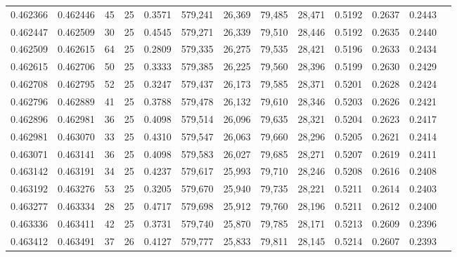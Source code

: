 \begin{tabular}{rrrrrrrrrrrrr}
0.462366 & 0.462446 &    45 &  25 &                                     0.3571 & 579,241 &  26,369 &  79,485 &  28,471 & 0.5192 & 0.2637 & 0.2443 \\
0.462447 & 0.462509 &    30 &  25 &                                     0.4545 & 579,271 &  26,339 &  79,510 &  28,446 & 0.5192 & 0.2635 & 0.2440 \\
0.462509 & 0.462615 &    64 &  25 &                                     0.2809 & 579,335 &  26,275 &  79,535 &  28,421 & 0.5196 & 0.2633 & 0.2434 \\
0.462615 & 0.462706 &    50 &  25 &                                     0.3333 & 579,385 &  26,225 &  79,560 &  28,396 & 0.5199 & 0.2630 & 0.2429 \\
0.462708 & 0.462795 &    52 &  25 &                                     0.3247 & 579,437 &  26,173 &  79,585 &  28,371 & 0.5201 & 0.2628 & 0.2424 \\
0.462796 & 0.462889 &    41 &  25 &                                     0.3788 & 579,478 &  26,132 &  79,610 &  28,346 & 0.5203 & 0.2626 & 0.2421 \\
0.462896 & 0.462981 &    36 &  25 &                                     0.4098 & 579,514 &  26,096 &  79,635 &  28,321 & 0.5204 & 0.2623 & 0.2417 \\
0.462981 & 0.463070 &    33 &  25 &                                     0.4310 & 579,547 &  26,063 &  79,660 &  28,296 & 0.5205 & 0.2621 & 0.2414 \\
0.463071 & 0.463141 &    36 &  25 &                                     0.4098 & 579,583 &  26,027 &  79,685 &  28,271 & 0.5207 & 0.2619 & 0.2411 \\
0.463142 & 0.463191 &    34 &  25 &                                     0.4237 & 579,617 &  25,993 &  79,710 &  28,246 & 0.5208 & 0.2616 & 0.2408 \\
0.463192 & 0.463276 &    53 &  25 &                                     0.3205 & 579,670 &  25,940 &  79,735 &  28,221 & 0.5211 & 0.2614 & 0.2403 \\
0.463277 & 0.463334 &    28 &  25 &                                     0.4717 & 579,698 &  25,912 &  79,760 &  28,196 & 0.5211 & 0.2612 & 0.2400 \\
0.463336 & 0.463411 &    42 &  25 &                                     0.3731 & 579,740 &  25,870 &  79,785 &  28,171 & 0.5213 & 0.2609 & 0.2396 \\
0.463412 & 0.463491 &    37 &  26 &                                     0.4127 & 579,777 &  25,833 &  79,811 &  28,145 & 0.5214 & 0.2607 & 0.2393 \\

\end{tabular}
